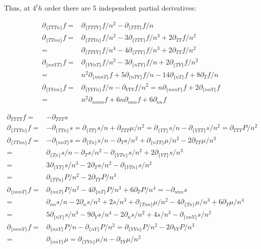\documentclass[11pt,letter]{article}
\begin{document}
Thus, at $4^th$ order there are 5 independent partial derivatives:
\begin{mdframed}
\begin{equation}
 \begin{split}
  \partial_{\{TTTn\}}f=&\partial_{\{TTTY\}}f/n^2-\partial_{\{TTT\}}f/n\\
  \partial_{\{TTnn\}}f=&\partial_{\{TTYn\}}f/n^2-3\partial_{\{TTY\}}f/n^3+2\partial_{TT}f/n^2\\
  =&\partial_{\{TTYY\}}f/n^4-4\partial_{\{TTY\}}f/n^3+2\partial_{TT}f/n^2\\
  \partial_{\{nnYT\}}f=&\partial_{\{YYnT\}}f/n^2-3\partial_{\{nTY\}}f/n+2\partial_{\{TY\}}f/n^2\\
  =&n^2\partial_{\{nnnT\}}f+5\partial_{\{nTY\}}f/n-14 \partial_{\{nT\}}f+8\partial_Tf/n\\
  \partial_{\{YYnn\}}f=&\partial_{\{YYYn\}}f/n-\partial_{YYY}f/n^2=n\partial_{\{nnnY\}}f+2\partial_{\{nnY\}}f\\
  =&n^2\partial_{nnnn}f+6n\partial_{nnn}f+6\partial_{nn}f
  \end{split}
\end{equation}
\end{mdframed}
\begin{mdframed}
\begin{equation}
 \begin{split}
 \partial_{TTTT}f=&-\partial_{TTT}s\\
  \partial_{\{TTTn\}}f=&-\partial_{\{TTn\}}s=\partial_{\{TT\}}s/n+\partial_{TTT}\mu/n^2=\partial_{\{TT\}}s/n-\partial_{\{YTT\}}s/n^2=\partial_{TTT}P/n^2\\
  \partial_{\{TTnn\}}f=&-\partial_{\{nnT\}}s=\partial_{\{Tn\}}s/n-\partial_{T}s/n^2+\partial_{\{nTT\}}\mu/n^2-2\partial_{TT}\mu/n^3\\
  =&\partial_{\{Tn\}}s/n-\partial_{T}s/n^2-\partial_{\{YTn\}}s/n^2+2\partial_{\{YT\}}s/n^3\\
  =&3\partial_{\{YT\}}s/n^3-2\partial_{T}s/n^2-\partial_{\{YTn\}}s/n^2\\
  =&\partial_{\{TTn\}}P/n^2-2\partial_{TT}P/n^3\\
  \partial_{\{nnnT\}}f=&\partial_{\{nnT\}}P/n^2-4\partial_{\{nT\}}P/n^3+6\partial_{T}P/n^4=-\partial_{nnn}s\\
  =&\partial_{nn}s/n-2\partial_{n}s/n^2+2s/n^3+\partial_{\{Tnn\}}\mu/n^2-4\partial_{\{Tn\}}\mu/n^3+6\partial_{T}\mu/n^4\\
  =&5\partial_{\{nY\}}s/n^3-9\partial_{Y}s/n^4-2\partial_ns/n^2+4s/n^3-\partial_{\{nnY\}}s/n^2\\
  \partial_{\{nnnY\}}f=&\partial_{\{nnY\}}P/n-\partial_{\{nY\}}P/n^2=\partial_{\{YYn\}}P/n^2-2\partial_{YY}P/n^3\\
  =&\partial_{\{nnY\}}\mu=\partial_{\{YYn\}}\mu/n-\partial_{YY}\mu/n^2
  \end{split}
\end{equation}
\end{mdframed}
\end{document}
